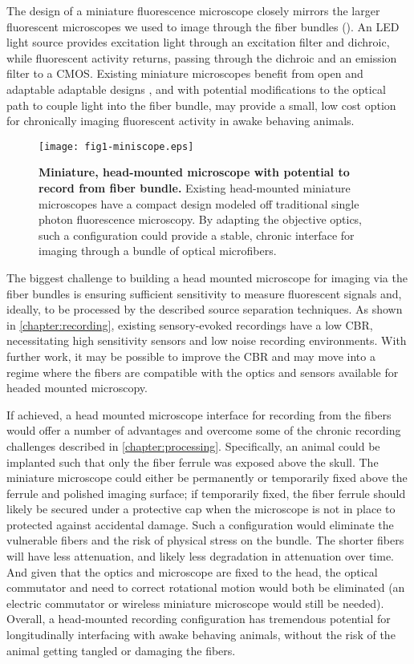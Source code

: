 The design of a miniature fluorescence microscope 
closely mirrors the larger fluorescent microscopes 
we used to image through the fiber bundles 
(). An LED light source 
provides excitation light through an excitation 
filter and dichroic, while fluorescent activity 
returns, passing through the dichroic and an 
emission filter to a CMOS. Existing miniature 
microscopes benefit from open and adaptable 
adaptable designs \cite{Cai:2016hm,LibertiIII:2017df},
and with potential modifications to the optical 
path to couple light into the fiber bundle, 
may provide a small, low cost option for 
chronically imaging fluorescent activity in awake
behaving animals.

\begin{figure}
\texttt{[image: fig1-miniscope.eps]}
\caption[Miniature microscope]{\textbf{Miniature, head-mounted 
microscope with potential to record from fiber bundle.} Existing 
head-mounted miniature microscopes have a compact design modeled 
off traditional single photon fluorescence microscopy. By 
adapting the objective optics, such a configuration could 
provide a stable, chronic interface for imaging through a bundle 
of optical microfibers. \cite{LibertiIII:2017df}}
\label{fig:miniscope}
\end{figure}

The biggest challenge to building a head 
mounted microscope for imaging via the fiber 
bundles is ensuring sufficient sensitivity 
to measure fluorescent signals and, ideally,
to be processed by the described source 
separation techniques. As shown in 
\cref{chapter:recording}, existing 
sensory-evoked recordings have a low 
CBR, necessitating high sensitivity sensors 
and low noise recording environments. With 
further work, it may be possible to improve 
the CBR and may move into a regime where the 
fibers are compatible with the optics and 
sensors available for headed mounted microscopy.

If achieved, a head mounted microscope interface 
for recording from the fibers would offer a number 
of advantages and overcome some of the chronic 
recording challenges described in 
\cref{chapter:processing}. Specifically, an animal 
could be implanted such that only the fiber ferrule 
was exposed above the skull. The miniature 
microscope could either be permanently or temporarily 
fixed above the ferrule and polished imaging surface; 
if temporarily fixed, the fiber ferrule should likely 
be secured under a protective cap when the microscope 
is not in place to protected against accidental 
damage. Such a configuration would eliminate the 
vulnerable fibers and the risk of physical stress on 
the bundle. The shorter fibers will have less 
attenuation, and likely less degradation in attenuation 
over time. And given that the optics and microscope 
are fixed to the head, the optical commutator and 
need to correct rotational motion would both be 
eliminated (an electric commutator or wireless miniature 
microscope would still be needed). Overall, a head-mounted 
recording configuration has tremendous potential for 
longitudinally interfacing with awake behaving animals, 
without the risk of the animal getting tangled or 
damaging the fibers.

